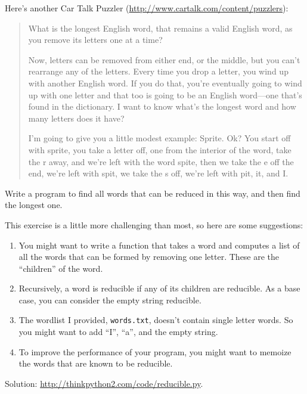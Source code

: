 \begin{exercise}

Here's another Car Talk Puzzler
(\url{http://www.cartalk.com/content/puzzlers}):

\begin{quote}
What is the longest English word, that remains a valid English word,
as you remove its letters one at a time?

Now, letters can be removed from either end, or the middle, but you
can't rearrange any of the letters. Every time you drop a letter, you
wind up with another English word. If you do that, you're eventually
going to wind up with one letter and that too is going to be an
English word---one that's found in the dictionary. I want to know
what's the longest word and how many letters does it
have?

I'm going to give you a little modest example: Sprite. Ok? You start
off with sprite, you take a letter off, one from the interior of the
word, take the r away, and we're left with the word spite, then we
take the e off the end, we're left with spit, we take the s off, we're
left with pit, it, and I.
\end{quote}

Write a program to find all words that can be reduced in this way,
and then find the longest one.

This exercise is a little more challenging than most, so here are
some suggestions:

\begin{enumerate}

\item You might want to write a function that takes a word and
  computes a list of all the words that can be formed by removing one
  letter.  These are the ``children'' of the word.

\item Recursively, a word is reducible if any of its children
are reducible.  As a base case, you can consider the empty
string reducible.

\item The wordlist I provided, {\tt words.txt}, doesn't
contain single letter words.  So you might want to add
``I'', ``a'', and the empty string.

\item To improve the performance of your program, you might want
to memoize the words that are known to be reducible.

\end{enumerate}

Solution: \url{http://thinkpython2.com/code/reducible.py}.

\end{exercise}







